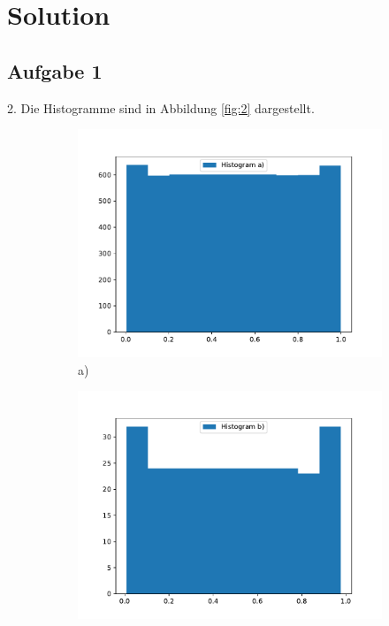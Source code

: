
\section{Solution}
\subsection{Aufgabe 1}

2. Die Histogramme sind in Abbildung \ref{fig:2} dargestellt.

\begin{figure}
      \begin{subfigure}[b]{0.5\textwidth}
        \includegraphics[width=\textwidth]{images/a.pdf}
        \caption{a)}
      \end{subfigure}
      \begin{subfigure}[b]{0.5\textwidth}
        \includegraphics[width=\textwidth]{images/b.pdf}

\end{subfigure}
\end{figure}
